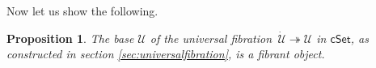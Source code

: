 \documentclass[11pt]{amsart}
\makeatletter
\newcommand{\cSet}{\ensuremath{\mathsf{cSet}}}
\newcommand{\fib}{\ensuremath{\twoheadrightarrow}}
\renewcommand{\to}{\ensuremath{\rightarrow}}
\newcommand{\I}{\ensuremath{\mathrm{I}}}
\newcommand{\U}{\ensuremath{\mathcal{U}}}
\newcommand{\UU}{\ensuremath{\,\dot{\mathcal{U}}}}
\newcommand{\V}{\ensuremath{\mathcal{V}}}
\newcommand{\VV}{\ensuremath{\dot{\mathcal{V}}}}
\newcommand{\Fib}{\ensuremath{\mathsf{Fib}}}
\newtheorem{proposition}[theorem]{Proposition}
\theoremstyle{remark}
\theoremstyle{definition}
\newcommand{\pbcorner}[1][dr]{\save*!/#1-1.2pc/#1:(-1,1)@^{|-}\restore}
\makeatother
\begin{document}
%

Now let us show the following.
\begin{proposition}\label{prop:Ufibrant}
The base $\U$ of the universal fibration $\UU\fib\U$ in $\cSet$, as constructed in section \ref{sec:universalfibration}, is a fibrant object.
\end{proposition}
\end{document}
